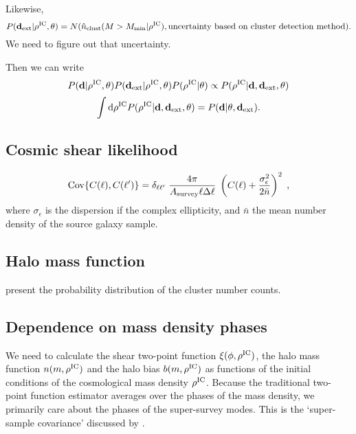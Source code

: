 \documentclass[preprint]{aastex}
\newcommand{\data}{\mathbf{d}}
\newcommand{\dataext}{\data_{\rm ext}}
\newcommand{\skyangle}{\phi}
\newcommand{\rhoic}{\rho^{\rm IC}}
\begin{document}
Likewise,
\begin{equation}
	P(\dataext|\rho^\text{IC},\theta) = N(\hat{n}_\text{clust}(M>M_\text{min} |
	\rho^\text{IC}), \text{uncertainty based on cluster detection method}).
\end{equation}
We need to figure out that uncertainty.

Then we can write
\begin{equation}
	P(\data|\rho^\text{IC},\theta)P(\dataext|\rho^\text{IC},\theta)P(\rho^\text{IC}|\theta)
	\propto P(\rho^\text{IC}|\data,\dataext,\theta)
\end{equation}
\begin{equation}
	\int \mathrm{d}\rho^\text{IC} P(\rho^\text{IC}|\data,\dataext,\theta) = P(\data|\theta,
	\dataext).
\end{equation}


\subsection{Cosmic shear likelihood}


\begin{equation}
	{\rm Cov}\{  C(\ell), C(\ell') \}= \delta_{\ell \ell'}\; \frac{4 \pi}{A_{\rm survey} \ell \Delta \ell}\; \left( C(\ell) + \frac{\sigma_\epsilon^2}{2 \bar{n}} \right)^2\;,
\end{equation}
where $\sigma_\epsilon$ is the dispersion if the complex ellipticity, and $\bar{n}$ the mean number density of the source galaxy sample.


\subsection{Halo mass function}
\citet{lima2004} present the probability distribution of the cluster number counts.

\subsection{Dependence on mass density phases} %
\label{sub:dependence_on_mass_density_phases}
We need to calculate the shear two-point function $\xi(\skyangle, \rhoic)$, 
the halo mass function $n(m, \rhoic)$
and the halo bias $b(m, \rhoic)$ as functions of the initial conditions of the 
cosmological mass density $\rhoic$. 
Because the traditional two-point function estimator averages over the phases 
of the mass density, we primarily care about the phases of the super-survey 
modes. This is the `super-sample covariance' discussed by 
\citet{takada2013}.
\end{document}
